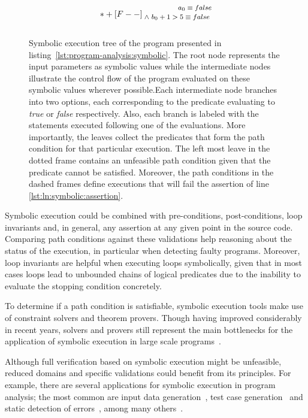 \begin{figure}[t]
\[{	 *+[F--] \txt{\footnotesize $~~~~~~~~~~~~~~~a_{0} \equiv false$ 
	 \\ \footnotesize $\land ~ b_{0}+1 > 5 \equiv false$
 \\ ~}			
} \]
\caption[Symbolic execution tree of a trivial program]{Symbolic execution tree of the program presented in listing~\ref{lst:program-analysis:symbolic}. The root node represents the input parameters as symbolic values while the intermediate nodes illustrate the control flow of the program evaluated on these symbolic values wherever possible.Each intermediate node branches into two options, each corresponding to the predicate evaluating to \textit{true} or \textit{false} respectively. Also, each branch is labeled with the statements executed following one of the evaluations. More importantly, the leaves collect the predicates that form the path condition for that particular execution. The left most leave in the dotted frame contains an unfeasible path condition given that the predicate cannot be satisfied. Moreover, the path conditions in the dashed frames define executions that will fail the assertion of line \ref{lst:ln:symbolic:assertion}.}
\label{fig:program-analysis:symbolic}
\end{figure}

Symbolic execution could be combined with pre-conditions, post-conditions, loop invariants and, in general, any assertion at any given point in the source code. Comparing path conditions against these validations help reasoning about the status of the execution, in particular when detecting faulty programs. Moreover, loop invariants are helpful when executing loops symbolically, given that in most cases loops lead to unbounded chains of logical predicates due to the inability to evaluate the stopping condition concretely.

To determine if a path condition is satisfiable, symbolic execution tools make use of constraint solvers and theorem provers. Though having improved considerably in recent years, solvers and provers still represent the main bottlenecks for the application of symbolic execution in large scale programs~\cite{Cadar2013}. 

Although full verification based on symbolic execution might be unfeasible, reduced domains and specific validations could benefit from its principles. For example, there are several applications for symbolic execution in program analysis; the most common are input data generation~\cite{Clarke1976}, test case generation~\cite{Cadar2008,Csallner,Godefroid2008,Visser2004a} and static detection of errors~\cite{Bush2000,Tomb2007}, among many others~\cite{Csallner2008,Siegel2006}.